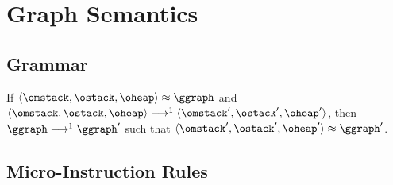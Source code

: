 \documentclass{article}
\begin{document}
\begin{definition}
\begin{multicols}{2}
          \end{multicols}
      \end{definition}

    \section{Graph Semantics}

      \subsection{Grammar}

      \begin{grammar}
        \grule[graph]{\ggraph}{ \{\gedge, \ldots\} }
        \grule[edges]{\gedge}{
                    \gnode \gsBefore \gnode
            \gor    \gnode \gsSkip \gnode
        }
        \grule[nodes]{\gnode}{
                    \gsstart
            \gor    \gsend
            \gor    \gsLR{\olbl, \omstack, \gtime}
            \gor    \gsLR{\genter \olbl, \gtime}
            \gor    \gsLR{\gleave \olbl, \gtime}
        }

      \end{grammar}

      \begin{theorem}[Bisimulation]
        If $\osLR{\omstack, \ostack, \oheap} \approx \ggraph$ and $\osLR{\omstack, \ostack, \oheap} \osTransition \osLR{\omstack', \ostack', \oheap'}$, then $\ggraph \gsTransition \ggraph'$ such that $\osLR{\omstack', \ostack', \oheap'} \approx \ggraph'$.
      \end{theorem}

      \subsection{Micro-Instruction Rules}
\end{document}
